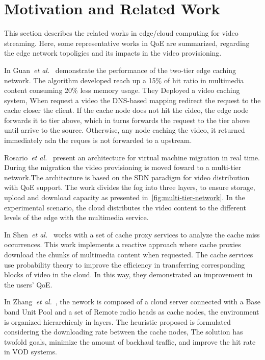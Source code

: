 \section{Motivation and Related Work}
\label{sec:related-work}

This section describes the related works in edge/cloud computing for video streaming. Here, some representative works in QoE are summarized, regarding the edge network topoligies and its impacts in the video provisioning.


In Guan~\textit{et al.}~\cite{guan:2019:CLC} demonstrate the performance of the two-tier edge caching network. The algorithm developed reach up a 15\% of hit ratio in multimedia content consuming 20\% less memory usage. They Deployed a video caching system, When request a video the DNS-based mapping redirect the request to the cache closer the client. If the cache node does not hit the cideo, the edge node forwards it to tier above, which in turns forwards the request to the tier above until arrive to the source. Otherwise, any node caching the video, it returned immediately adn the reques is not forwarded to a upstream.

Rosario~\textit{et al.}~\cite{rosarioSENSORS2018} present an architecture for virtual machine migration in real time. During the migration the video provisioning is moved foward to a multi-tier network.The architecture is based on the SDN paradigm for video distribution with QoE support. The work divides the fog into three layers, to ensure storage, upload and download capacity as presented in~\ref{fig:multi-tier-network}. In the experimental scenario, the cloud distributes the video content to the different levels of the edge with the multimedia service.

In Shen~\textit{et al.}~\cite{shenIWQoS19} works with a set of cache proxy services to analyze the cache miss occurrences. This work implements a reactive approach where cache proxies download the chunks of multimedia content when requested. The cache services use probability theory to improve the efficiency in transferring corresponding blocks of video in the cloud. In this way, they demonstrated an improvement in the users' QoE.

In Zhang~\textit{et al.}~\cite{zhang:WCNC2017}, the nework is composed of a cloud server connected with a Base band Unit Pool and a set of Remote radio heads as cache nodes, the environment is organized hierarchicaly in layers. The heuristic proposed is formulated considering the downloading rate between the cache nodes, The solution has twofold goals, minimize the amount of backhaul traffic, and improve the hit rate in VOD systems.



